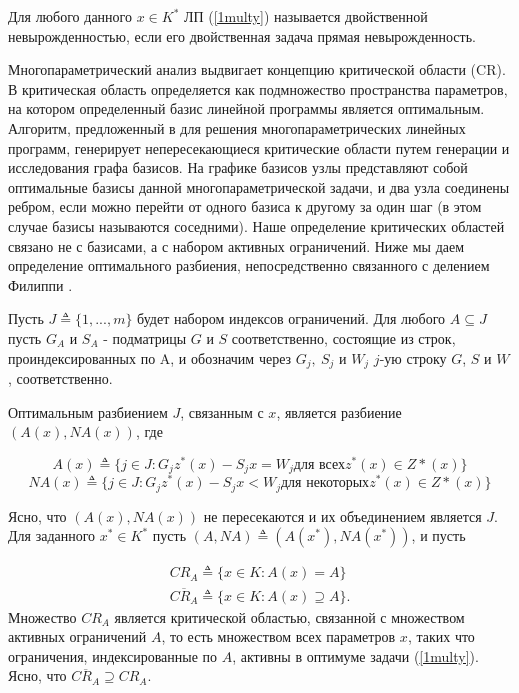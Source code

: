 \begin{definition}
    Для любого данного $x \in K^*$ ЛП (\ref{1multy}) называется двойственной невырожденностью, если его двойственная задача прямая невырожденность.
\end{definition}

Многопараметрический анализ выдвигает концепцию критической области (CR). 
В \cite{Nedoma} критическая область определяется как подмножество пространства параметров, на котором определенный базис линейной программы является оптимальным. 
Алгоритм, предложенный в \cite{Nedoma} для решения многопараметрических линейных программ, генерирует непересекающиеся критические области путем генерации и исследования графа базисов. На графике базисов узлы представляют собой оптимальные базисы данной многопараметрической задачи, и два узла соединены ребром, если можно перейти от одного базиса к другому за один шаг (в этом случае базисы называются соседними). Наше определение критических областей связано не с базисами, а с набором активных ограничений. Ниже мы даем определение оптимального разбиения, непосредственно связанного с делением Филиппи \cite{Filippi}.

Пусть $J \triangleq \{1,..., m\}$ будет набором индексов ограничений. Для любого $A \subseteq J$ пусть $G_{A}$ и $S_A$ - подматрицы $G$ и $S$ соответственно, состоящие из строк, проиндексированных по A, и обозначим через $G_{j},\ S_{j}$ и $W_{j}$ $j$-ую строку $G$, $S$ и $W$, соответственно.


\begin{definition}
    Оптимальным разбиением $J$, связанным с $x$, является разбиение $(A(x), N A(x))$, где

    $$A(x) \triangleq \{ j \in J: G_{j}z^*(x) - S_{j}x = W_{j} \text{для всех} z^*(x) \in Z*(x) \}$$
    $$N A(x) \triangleq \{ j \in J: G_{j}z^*(x) - S_{j}x < W_{j} \text{для некоторых} z^*(x) \in Z*(x) \}$$
\end{definition}
Ясно, что $(A (x), N A(x))$ не пересекаются и их объединением является $J$. Для заданного $x^* \in K^*$ пусть $(A, NA) \triangleq (A (x^*), N A(x^*) )$, и пусть

\begin{equation}\label{3multy}
    \begin{split}
        CR_{A} \triangleq \{ x \in K: A(x) = A \}\\
        \overline{CR_{A}} \triangleq \{ x \in K: A(x) \supseteq A \}.
    \end{split}
\end{equation}
Множество $CR_{A}$ является критической областью, связанной с множеством активных ограничений $A$, то есть множеством всех параметров $x$, таких что ограничения, индексированные по $A$, активны в оптимуме задачи (\ref{1multy}). Ясно, что $\overline{CR_{A}} \supseteq CR_{A}$.


